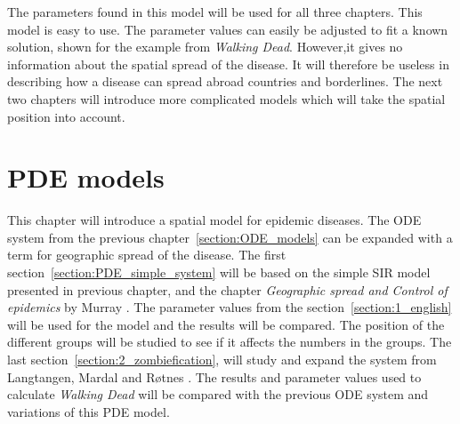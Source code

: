\documentclass[%
twoside,                 %
final,                   %
chapterprefix=true,      %
open=right               %
10pt]{book}
\begin{document}
\vspace{3mm}


The parameters found in this model will be used for all three chapters. This model is easy to use. The parameter values can easily be adjusted to fit a known solution, shown for the example from \emph{Walking Dead}. However,it gives no information about the spatial spread of the disease. It will therefore be useless in describing how a disease can spread abroad countries and borderlines. The next two chapters will introduce more complicated models which will take the spatial position into account. 


\chapter{PDE models}
\label{section:PDE_models}
This chapter will introduce a spatial model for epidemic diseases. The ODE system from the previous chapter~\ref{section:ODE_models} can be expanded with a term for geographic spread of the disease. The first section~\ref{section:PDE_simple_system} will be based on the simple SIR model presented in previous chapter, and the chapter \emph{Geographic spread and Control of epidemics} by Murray \cite{murray2003mathematical}. The parameter values from the section~\ref{section:1_english} will be used for the model and the results will be compared. The position of the different groups will be studied to see if it affects the numbers in the groups. The last section~\ref{section:2_zombiefication}, will study and expand the system from Langtangen, Mardal and Røtnes \cite{zombie-math}. The results and parameter values used to calculate \emph{Walking Dead} will be compared with the previous ODE system and variations of this PDE model. 
\end{document}
